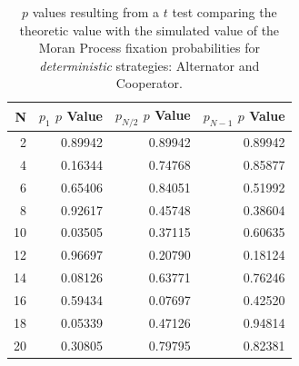 \documentclass[10pt,letterpaper]{article}
\begin{document}
\begin{table}[!hbtp]
    \centering

        \begin{tabular}{rrrr}
        \toprule
          N &  $p_1$ $p$ Value &  $p_{N / 2}$ $p$ Value &  $p_{N - 1}$ $p$ Value \\
        \midrule
          2 &          0.89942 &                0.89942 &                0.89942 \\
          4 &          0.16344 &                0.74768 &                0.85877 \\
          6 &          0.65406 &                0.84051 &                0.51992 \\
          8 &          0.92617 &                0.45748 &                0.38604 \\
         10 &          0.03505 &                0.37115 &                0.60635 \\
         12 &          0.96697 &                0.20790 &                0.18124 \\
         14 &          0.08126 &                0.63771 &                0.76246 \\
         16 &          0.59434 &                0.07697 &                0.42520 \\
         18 &          0.05339 &                0.47126 &                0.94814 \\
         20 &          0.30805 &                0.79795 &                0.82381 \\
        \bottomrule
        \end{tabular}

    \caption{\(p\) values resulting from a $t$ test comparing the theoretic
        value with the simulated value of the Moran Process fixation
        probabilities for \textit{deterministic} strategies: Alternator and
    Cooperator.}
    \label{tab:comparison_deterministic}
\end{table}
\end{document}
